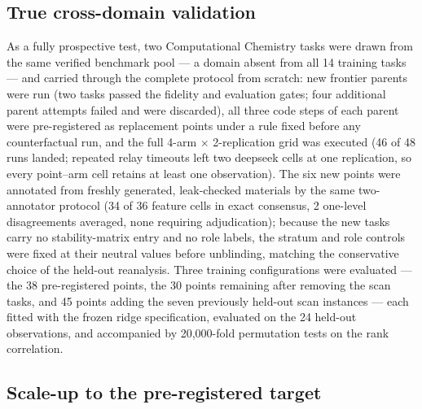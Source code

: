 \subsection*{True cross-domain validation}

As a fully prospective test, two Computational Chemistry tasks were drawn from the same verified benchmark pool --- a domain absent from all 14 training tasks --- and carried through the complete protocol from scratch: new frontier parents were run (two tasks passed the fidelity and evaluation gates; four additional parent attempts failed and were discarded), all three code steps of each parent were pre-registered as replacement points under a rule fixed before any counterfactual run, and the full 4-arm $\times$ 2-replication grid was executed (46 of 48 runs landed; repeated relay timeouts left two deepseek cells at one replication, so every point--arm cell retains at least one observation). The six new points were annotated from freshly generated, leak-checked materials by the same two-annotator protocol (34 of 36 feature cells in exact consensus, 2 one-level disagreements averaged, none requiring adjudication); because the new tasks carry no stability-matrix entry and no role labels, the stratum and role controls were fixed at their neutral values before unblinding, matching the conservative choice of the held-out reanalysis. Three training configurations were evaluated --- the 38 pre-registered points, the 30 points remaining after removing the scan tasks, and 45 points adding the seven previously held-out scan instances --- each fitted with the frozen ridge specification, evaluated on the 24 held-out observations, and accompanied by 20,000-fold permutation tests on the rank correlation.

\subsection*{Scale-up to the pre-registered target}

